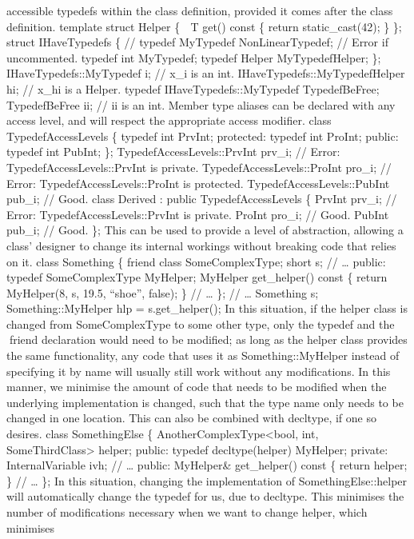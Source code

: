 accessible typedefs within the class deﬁnition, provided it comes after
the class deﬁnition. template struct Helper \{  T get() const \{ return
static\_cast(42); \} \}; struct IHaveTypedefs \{ // typedef MyTypedef
NonLinearTypedef; // Error if uncommented. typedef int MyTypedef;
typedef Helper MyTypedefHelper; \}; IHaveTypedefs::MyTypedef i; // x\_i
is an int. IHaveTypedefs::MyTypedefHelper hi; // x\_hi is a Helper.
typedef IHaveTypedefs::MyTypedef TypedefBeFree; TypedefBeFree ii; // ii
is an int. Member type aliases can be declared with any access level,
and will respect the appropriate access modiﬁer. class
TypedefAccessLevels \{ typedef int PrvInt; protected: typedef int
ProInt; public: typedef int PubInt; \}; TypedefAccessLevels::PrvInt
prv\_i; // Error: TypedefAccessLevels::PrvInt is private.
TypedefAccessLevels::ProInt pro\_i; // Error:
TypedefAccessLevels::ProInt is protected. TypedefAccessLevels::PubInt
pub\_i; // Good. class Derived : public TypedefAccessLevels \{ PrvInt
prv\_i; // Error: TypedefAccessLevels::PrvInt is private. ProInt pro\_i;
// Good. PubInt pub\_i; // Good. \}; This can be used to provide a level
of abstraction, allowing a class' designer to change its internal
workings without breaking code that relies on it. class Something \{
friend class SomeComplexType; short s; // \ldots{} public: typedef
SomeComplexType MyHelper; MyHelper get\_helper() const \{ return
MyHelper(8, s, 19.5, ``shoe'', false); \} // \ldots{} \}; // \ldots{}
Something s; Something::MyHelper hlp = s.get\_helper(); In this
situation, if the helper class is changed from SomeComplexType to some
other type, only the typedef and the friend declaration would need to
be modiﬁed; as long as the helper class provides the same functionality,
any code that uses it as Something::MyHelper instead of specifying it by
name will usually still work without any modiﬁcations. In this manner,
we minimise the amount of code that needs to be modiﬁed when the
underlying implementation is changed, such that the type name only needs
to be changed in one location. This can also be combined with decltype,
if one so desires. class SomethingElse \{
AnotherComplexType\textless bool, int, SomeThirdClass\textgreater{}
helper; public: typedef decltype(helper) MyHelper; private:
InternalVariable ivh; // \ldots{} public: MyHelper\& get\_helper() const
\{ return helper; \} // \ldots{} \}; In this situation, changing the
implementation of SomethingElse::helper will automatically change the
typedef for us, due to decltype. This minimises the number of
modiﬁcations necessary when we want to change helper, which minimises
